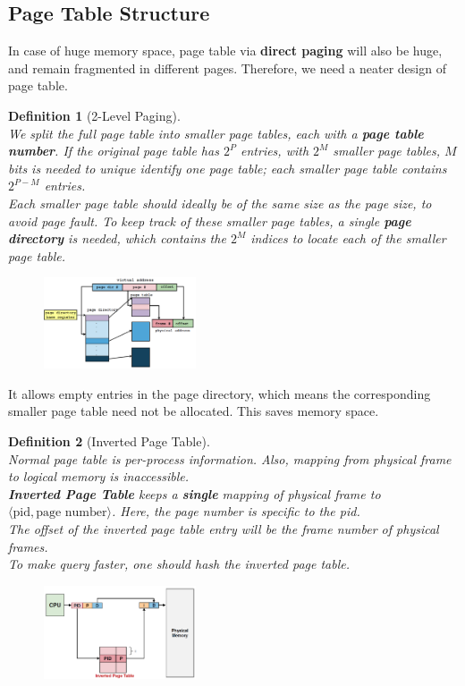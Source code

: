 \documentclass[12pt]{article}
\newtheorem{definition}{Definition}[section]
\theoremstyle{definition}
\begin{document}
\subsection{Page Table Structure}
In case of huge memory space, page table via \textbf{direct paging} will also be huge, and remain fragmented in different pages. Therefore, we need a neater design of page table.\\
\begin{definition}[2-Level Paging]
\hfill\\\normalfont We split the full page table into smaller page tables, each with a \textbf{page table number}. If the original page table has $2^P$ entries, with $2^M$ smaller page tables, $M$ bits is needed to unique identify one page table; each smaller page table contains $2^{P-M}$ entries.\\
Each smaller page table should ideally be of the same size as the page size, to avoid page fault.
To keep track of these smaller page tables, a single \textbf{page directory} is needed, which contains the $2^M$ indices to locate each of the smaller page table.
\begin{figure}[h]
\centering
\includegraphics[width=0.4\textwidth]{9_2.png}
\end{figure}
\end{definition}
It allows empty entries in the page directory, which means the corresponding smaller page table need not be allocated. This saves memory space.
\begin{definition}[Inverted Page Table]
\hfill\\\normalfont Normal page table is per-process information. Also, mapping from physical frame to logical memory is inaccessible.\\
\textbf{Inverted Page Table} keeps a \textbf{single} mapping of physical frame to $\langle \text{pid}, \text{page number}\rangle$. Here, the page number is specific to the pid.\\
The offset of the inverted page table entry will be the frame number of physical frames.\\
To make query faster, one should hash the inverted page table.
\begin{figure}[h]
\centering
\includegraphics[width=0.4\textwidth]{9_3.png}
\end{figure}
\end{definition}
\end{document}
